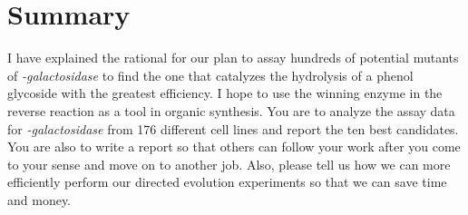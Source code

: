 \documentclass[]{tufte-handout}
\begin{document}
\section{Summary}

I have explained the rational for our plan to assay hundreds of potential mutants of \emph{\textbeta -galactosidase} to find the one that catalyzes the hydrolysis of a phenol glycoside with the greatest efficiency. I hope to use the winning enzyme in the reverse reaction as a tool in organic synthesis. You are to analyze the assay data for \emph{\textbeta -galactosidase} from 176 different cell lines and report the ten best candidates. You are also to write a report so that others can follow your work after you come to your sense and move on to another job. Also, please tell us how we can more efficiently perform our directed evolution experiments so that we can save time and money.



\nobibliography{}
\end{document}
